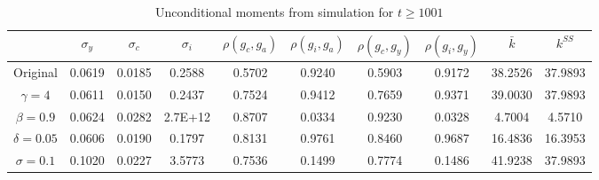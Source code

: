 \documentclass[]{article}
\begin{document}
\begin{table}[!htb]
	\centering
	\begin{tabular}{c|ccccccccc}
	 & $\sigma_y$ & $\sigma_c$ & $\sigma_i$ & $\rho(g_c, g_a)$ & $\rho(g_i, g_a)$ & $\rho(g_c, g_y)$ & $\rho(g_i, g_y)$ & $\bar{k}$ & $k^{SS}$ \\ \hline
	Original        & 0.0619 & 0.0185 & 0.2588  & 0.5702 & 0.9240 & 0.5903 & 0.9172 & 38.2526 & 37.9893 \\
	$\gamma = 4$    & 0.0611 & 0.0150 & 0.2437  & 0.7524 & 0.9412 & 0.7659 & 0.9371 & 39.0030 & 37.9893 \\
	$\beta = 0.9$   & 0.0624 & 0.0282 & 2.7E+12 & 0.8707 & 0.0334 & 0.9230 & 0.0328 & 4.7004  & 4.5710  \\
	$\delta = 0.05$ & 0.0606 & 0.0190 & 0.1797  & 0.8131 & 0.9761 & 0.8460 & 0.9687 & 16.4836 & 16.3953 \\
	$\sigma = 0.1$  & 0.1020 & 0.0227 & 3.5773  & 0.7536 & 0.1499 & 0.7774 & 0.1486 & 41.9238 & 37.9893
	\end{tabular}
	\caption{Unconditional moments from simulation for $t\geq1001$}
	\label{tab:ex2results}
\end{table}
\end{document}
